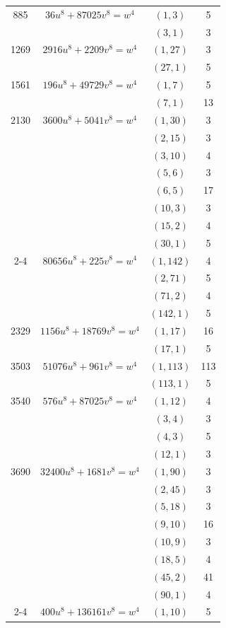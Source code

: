 \documentclass[a4paper,12pt,english,reqno]{amsart}
\begin{document}
\begin{center}
\begin{longtable}{|c|c|c|c|}
\hline 
\endlastfoot
885 & $36u^8+87025v^8 =w^4$ & $(1,3)$ & 5 \\
& & $(3,1)$ & 3 \\\hline
1269 & $2916u^8 + 2209v^8= w^4$ & $(1,27)$ & 3 \\
&& $(27,1)$ & 5 \\\hline
1561 & $196 u^8 +  49729v^8= w^4$ & $(1,7)$ & 5 \\
&& $(7,1)$ & 13 \\\hline
2130 & $3600 u^8 + 5041 v^8 = w^4$ & $(1,30)$ & 3 \\ 
&& $(2,15)$ & 3 \\
&& $(3,10)$ & 4 \\
&& $(5,6)$ & 3 \\
&& $(6,5)$ & 17 \\
&& $(10,3)$ & 3 \\
&& $(15,2)$ & 4 \\ 
&& $(30,1)$ & 5 \\\cline{2-4}
& $80656 u^8 + 225 v^8=w^4$ & $(1,142)$ & 4 \\
&& $(2,71)$ & 5 \\
&& $(71,2)$ & 4 \\ 
&& $(142,1)$ & 5 \\\hline
2329 & $1156 u^8 + 18769 v^8=w^4$ & $(1,17)$ & 16 \\
&& $(17,1)$ & 5 \\\hline
3503 & $51076 u^8 + 961 v^8=w^4$ & $(1,113)$ & 113 \\
&& $(113,1)$ & 5 \\\hline
3540 & $576  u^8 +87025 v^8=w^4$ & $(1,12)$ & 4 \\
&& $(3,4)$ & 3 \\
&& $(4,3)$ & 5 \\
&& $(12,1)$ & 3 \\\hline
3690 & $32400 u^8 + 1681 v^8= w^4$ & $(1,90)$ & 3 \\
&& $(2,45)$ & 3 \\
&& $(5,18)$ & 3 \\
&& $(9,10)$ & 16 \\
&& $(10,9)$ & 3 \\
&& $(18,5)$ & 4 \\
&& $(45,2)$ & 41 \\
&& $(90,1)$ & 4 \\\cline{2-4}
& $400  u^8 + 136161v^8=  w^4$ & $(1,10)$ & 5 \\

\end{longtable}
\end{center}
\end{document}
